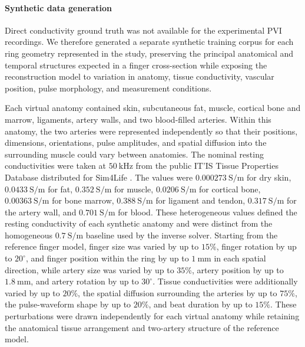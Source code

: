 \documentclass[11pt]{article}
\begin{document}
\paragraph{Synthetic data generation}
\label{sec:gcnm-synthetic-data}
\mbox{}\par

Direct conductivity ground truth was not available for the experimental PVI recordings.
We therefore generated a separate synthetic training corpus for each ring geometry represented in the study, preserving the principal anatomical and temporal structures expected in a finger cross-section while exposing the reconstruction model to variation in anatomy, tissue conductivity, vascular position, pulse morphology, and measurement conditions.

Each virtual anatomy contained skin, subcutaneous fat, muscle, cortical bone and marrow, ligaments, artery walls, and two blood-filled arteries.
Within this anatomy, the two arteries were represented independently so that their positions, dimensions, orientations, pulse amplitudes, and spatial diffusion into the surrounding muscle could vary between anatomies.
\begingroup
The nominal resting conductivities were taken at $50~\mathrm{kHz}$ from the public IT'IS Tissue Properties Database distributed for Sim4Life \cite{ITIS2024}.
The values were $0.000273~\mathrm{S/m}$ for dry skin, $0.0433~\mathrm{S/m}$ for fat, $0.352~\mathrm{S/m}$ for muscle, $0.0206~\mathrm{S/m}$ for cortical bone, $0.00363~\mathrm{S/m}$ for bone marrow, $0.388~\mathrm{S/m}$ for ligament and tendon, $0.317~\mathrm{S/m}$ for the artery wall, and $0.701~\mathrm{S/m}$ for blood.
These heterogeneous values defined the resting conductivity of each synthetic anatomy and were distinct from the homogeneous $0.7~\mathrm{S/m}$ baseline used by the inverse solver.
\endgroup
Starting from the reference finger model, finger size was varied by up to $15\%$, finger rotation by up to $20^\circ$, and finger position within the ring by up to $1~\mathrm{mm}$ in each spatial direction, while artery size was varied by up to $35\%$, artery position by up to $1.8~\mathrm{mm}$, and artery rotation by up to $30^\circ$.
Tissue conductivities were additionally varied by up to $20\%$, the spatial diffusion surrounding the arteries by up to $75\%$, the pulse-waveform shape by up to $20\%$, and beat duration by up to $15\%$.
These perturbations were drawn independently for each virtual anatomy while retaining the anatomical tissue arrangement and two-artery structure of the reference model.
\end{document}
